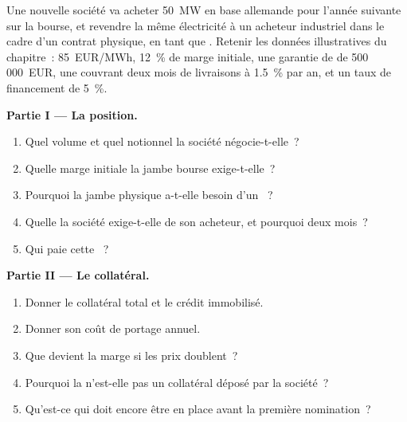\begin{problem}\label{pb:m3:getting-access-commodities-and-power:1}
Une nouvelle société va acheter 50~MW en base allemande pour l'année suivante sur la bourse, et revendre la même électricité à un
acheteur industriel dans le cadre d'un contrat physique, en tant que . Retenir les données illustratives
du chapitre~: \qty{85}{EUR/MWh}, 12~\% de marge initiale, une garantie de  de 500\,000~EUR, une 
couvrant deux mois de livraisons à 1.5~\% par an, et un taux de financement de 5~\%.

\medskip\noindent\textbf{Partie I --- La position.}
\begin{enumerate}
\item Quel volume et quel notionnel la société négocie-t-elle~?
\item Quelle marge initiale la jambe bourse exige-t-elle~?
\item Pourquoi la jambe physique a-t-elle besoin d'un ~?
\item Quelle  la société exige-t-elle de son acheteur, et pourquoi deux mois~?
\item Qui paie cette ~?
\end{enumerate}

\medskip\noindent\textbf{Partie II --- Le collatéral.}
\begin{enumerate}[resume]
\item Donner le collatéral total et le crédit immobilisé.
\item Donner son coût de portage annuel.
\item Que devient la marge si les prix doublent~?
\item Pourquoi la  n'est-elle pas un collatéral déposé par la société~?
\item Qu'est-ce qui doit encore être en place avant la première nomination~?
\end{enumerate}


\end{problem}
